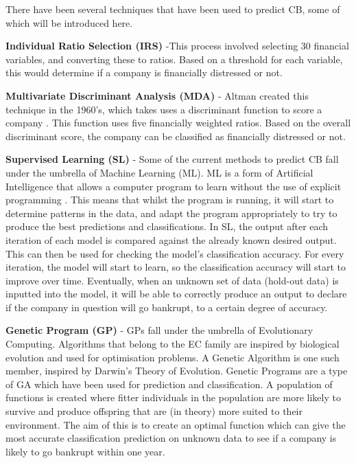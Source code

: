 \documentclass[11pt]{article}
\begin{document}
 There have been several techniques that have been used to predict CB, some of which will be introduced here.  

\textbf{Individual Ratio Selection (IRS)} -This process involved selecting 30 financial variables, and converting these to ratios. Based on a threshold for each variable, this would determine if a company is financially distressed or not.

\textbf{Multivariate Discriminant Analysis (MDA)} - Altman created this technique in the 1960's, which takes uses a discriminant function to score a company \cite{ref-six}. This function uses five financially weighted ratios. Based on the overall discriminant score, the company can be classified as financially distressed or not.

\textbf{Supervised Learning (SL)} - Some of the current methods to predict CB fall under the umbrella of Machine Learning (ML). ML is a form of Artificial Intelligence that allows a computer program to learn without the use of explicit programming \cite{ref-six}. This means that whilst the program is running, it will start to determine patterns in the data, and adapt the program appropriately to try to produce the best predictions and classifications.
In SL, the output after each iteration of each model is compared against the already known desired output. This can then be used for checking the model's classification accuracy. For every iteration, the model will start to learn, so the classification accuracy will start to improve over time. Eventually, when an unknown set of data (hold-out data) is inputted into the model, it will be able to correctly produce an output to declare if the company in question will go bankrupt, to a certain degree of accuracy.

\textbf{Genetic Program (GP)} - GPs fall under the umbrella of Evolutionary Computing. Algorithms that belong to the EC family are inspired by biological evolution and used for optimisation problems. A Genetic Algorithm is one such member, inspired by Darwin's Theory of Evolution. Genetic Programs are a type of GA which have been used for prediction and classification. A population of functions is created where fitter individuals in the population are more likely to survive and produce offspring that are (in theory) more suited to their environment. The aim of this is to create an optimal function which can give the most accurate classification prediction on unknown data to see if a company is likely to go bankrupt within one year. 
\end{document}

